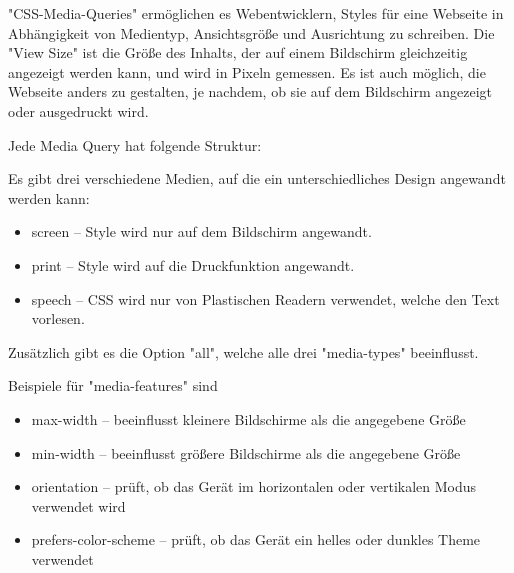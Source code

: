\label{sec:mediaQueries}

"CSS-Media-Queries" ermöglichen es Webentwicklern, Styles für eine Webseite in Abhängigkeit von Medientyp, Ansichtsgröße und Ausrichtung zu schreiben. 
Die "View Size" ist die Größe des Inhalts, der auf einem Bildschirm gleichzeitig angezeigt werden kann, und wird in Pixeln gemessen. 
Es ist auch möglich, die Webseite anders zu gestalten, je nachdem, ob sie auf dem Bildschirm angezeigt oder ausgedruckt wird. 

\begin{minipage}{\textwidth}
    Jede Media Query hat folgende Struktur:
    
\end{minipage}

Es gibt drei verschiedene Medien, auf die ein unterschiedliches Design angewandt werden kann: 
\begin{itemize}
    \item screen -- Style wird nur auf dem Bildschirm angewandt.
    \item print -- Style wird auf die Druckfunktion angewandt.
    \item speech -- CSS wird nur von Plastischen Readern verwendet, welche den Text vorlesen.
\end{itemize}

Zusätzlich gibt es die Option "all", welche alle drei "media-types" beeinflusst. \cite{w3MediaQueries}

Beispiele für "media-features" sind

\begin{itemize}
    \item max-width -- beeinflusst kleinere Bildschirme als die angegebene Größe
    \item min-width -- beeinflusst größere Bildschirme als die angegebene Größe 
    \item orientation -- prüft, ob das Gerät im horizontalen oder vertikalen Modus verwendet wird
    \item prefers-color-scheme -- prüft, ob das Gerät ein helles oder dunkles Theme verwendet
\end{itemize}
